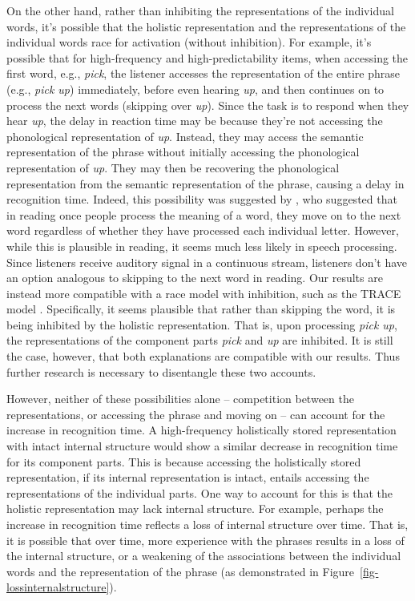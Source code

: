 \documentclass[
  authoryear,
  preprint,
  1p,
  onecolumn]{elsarticle}
\begin{document}
On the other hand, rather than inhibiting the representations of the
individual words, it's possible that the holistic representation and the
representations of the individual words race for activation (without
inhibition). For example, it's possible that for high-frequency and
high-predictability items, when accessing the first word, e.g.,
\emph{pick}, the listener accesses the representation of the entire
phrase (e.g., \emph{pick up}) immediately, before even hearing
\emph{up}, and then continues on to process the next words (skipping
over \emph{up}). Since the task is to respond when they hear \emph{up},
the delay in reaction time may be because they're not accessing the
phonological representation of \emph{up}. Instead, they may access the
semantic representation of the phrase without initially accessing the
phonological representation of \emph{up}. They may then be recovering
the phonological representation from the semantic representation of the
phrase, causing a delay in recognition time. Indeed, this possibility
was suggested by \citet{healy1976}, who suggested that in reading once
people process the meaning of a word, they move on to the next word
regardless of whether they have processed each individual letter.
However, while this is plausible in reading, it seems much less likely
in speech processing. Since listeners receive auditory signal in a
continuous stream, listeners don't have an option analogous to skipping
to the next word in reading. Our results are instead more compatible
with a race model with inhibition, such as the TRACE model
\citep{mcclellandTRACEModelSpeech1984}. Specifically, it seems plausible
that rather than skipping the word, it is being inhibited by the
holistic representation. That is, upon processing \emph{pick up}, the
representations of the component parts \emph{pick} and \emph{up} are
inhibited. It is still the case, however, that both explanations are
compatible with our results. Thus further research is necessary to
disentangle these two accounts.

However, neither of these possibilities alone -- competition between the
representations, or accessing the phrase and moving on -- can account
for the increase in recognition time. A high-frequency holistically
stored representation with intact internal structure would show a
similar decrease in recognition time for its component parts. This is
because accessing the holistically stored representation, if its
internal representation is intact, entails accessing the representations
of the individual parts. One way to account for this is that the
holistic representation may lack internal structure. For example,
perhaps the increase in recognition time reflects a loss of internal
structure over time. That is, it is possible that over time, more
experience with the phrases results in a loss of the internal structure,
or a weakening of the associations between the individual words and the
representation of the phrase (as demonstrated in
Figure~\ref{fig-lossinternalstructure}).
\end{document}
